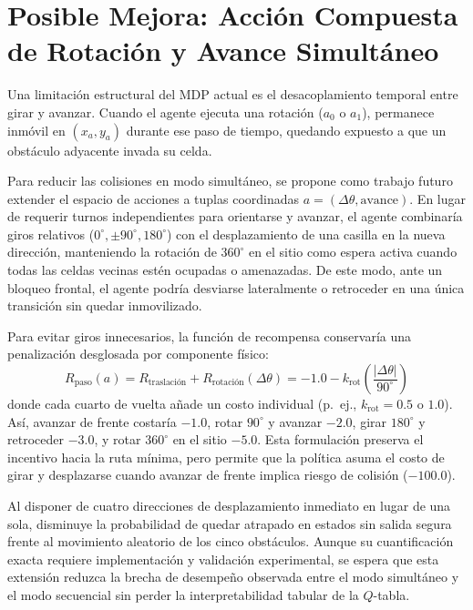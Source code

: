 \documentclass[11pt,a4paper]{article}
\begin{document}
\section{Posible Mejora: Acción Compuesta de Rotación y Avance Simultáneo}

Una limitación estructural del MDP actual es el desacoplamiento temporal entre girar y avanzar. Cuando el agente ejecuta una rotación (\(a_0\) o \(a_1\)), permanece inmóvil en \((x_a, y_a)\) durante ese paso de tiempo, quedando expuesto a que un obstáculo adyacente invada su celda.

Para reducir las colisiones en modo simultáneo, se propone como trabajo futuro extender el espacio de acciones a tuplas coordinadas \(a = (\Delta\theta, \text{avance})\). En lugar de requerir turnos independientes para orientarse y avanzar, el agente combinaría giros relativos (\(0^\circ, \pm 90^\circ, 180^\circ\)) con el desplazamiento de una casilla en la nueva dirección, manteniendo la rotación de \(360^\circ\) en el sitio como espera activa cuando todas las celdas vecinas estén ocupadas o amenazadas. De este modo, ante un bloqueo frontal, el agente podría desviarse lateralmente o retroceder en una única transición sin quedar inmovilizado.

Para evitar giros innecesarios, la función de recompensa conservaría una penalización desglosada por componente físico:
\begin{equation}
R_{\text{paso}}(a) = R_{\text{traslación}} + R_{\text{rotación}}(\Delta\theta) = -1.0 - k_{\text{rot}} \left(\frac{|\Delta\theta|}{90^\circ}\right)
\end{equation}
donde cada cuarto de vuelta añade un costo individual (p.\ ej., \(k_{\text{rot}} = 0.5\) o \(1.0\)). Así, avanzar de frente costaría \(-1.0\), rotar \(90^\circ\) y avanzar \(-2.0\), girar \(180^\circ\) y retroceder \(-3.0\), y rotar \(360^\circ\) en el sitio \(-5.0\). Esta formulación preserva el incentivo hacia la ruta mínima, pero permite que la política asuma el costo de girar y desplazarse cuando avanzar de frente implica riesgo de colisión (\(-100.0\)).

Al disponer de cuatro direcciones de desplazamiento inmediato en lugar de una sola, disminuye la probabilidad de quedar atrapado en estados sin salida segura frente al movimiento aleatorio de los cinco obstáculos. Aunque su cuantificación exacta requiere implementación y validación experimental, se espera que esta extensión reduzca la brecha de desempeño observada entre el modo simultáneo y el modo secuencial sin perder la interpretabilidad tabular de la \(Q\)-tabla.
\end{document}
